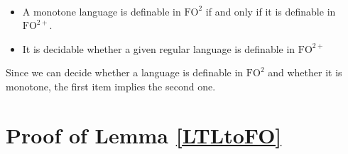 \documentclass[a4paper,UKenglish,cleveref, autoref, thm-restate]{lipics-v2021}
\newcommand{\FO}{\mathrm{FO}}
\newcommand{\FOtw}{\FO^2}
\newcommand{\FOtwp}{\FO^{2+}}
\begin{document}
\begin{conjecture} \label{conj}~
\begin{itemize}
    \item A monotone language is definable in $\FOtw$ if and only if it is definable in $\FOtwp$.
    \item It is decidable whether a given regular language is definable in $\FOtwp$
\end{itemize}

\end{conjecture}

Since we can decide whether a language is definable in $\FOtw$ and whether it is monotone, the first item implies the second one.












\appendix




\section{Proof of Lemma \ref{LTLtoFO}}\label{app:LTLtoFO}
\end{document}
